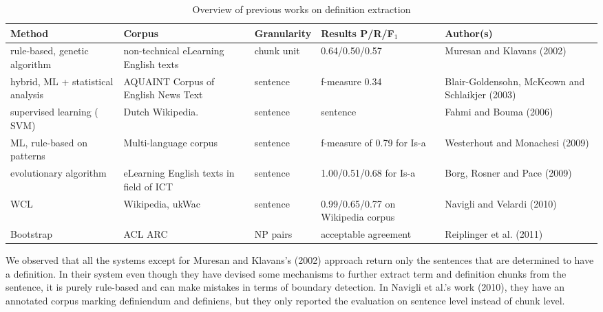 \documentclass[hyp]{socreport}
\begin{document}
\begin{table}
	
	\centering
    \begin{tabular}{|p{2.75cm}|p{2.75cm}|p{2.25cm}|p{2.75cm}|p{3cm}|}
\hline
        \bf{Method}                            & \bf{Corpus}                                  & \bf{Granularity} & \bf{Results P/R/F$_1$}                      & \bf{Author(s)}                                       \\ \hline
        rule-based, genetic algorithm     & non-technical eLearning English texts   & chunk unit  & 0.64/0.50/0.57                     & Muresan and Klavans (2002)                      \\ \hline
        hybrid, ML + statistical analysis & AQUAINT Corpus of English News Text     & sentence    & f-measure 0.34                     & Blair-Goldensohn, McKeown and Schlaikjer (2003) \\ \hline
        supervised learning ( SVM)        & Dutch Wikipedia.                        & sentence    & sentence                           & Fahmi and Bouma (2006)                          \\ \hline
        ML, rule-based on patterns        & Multi-language corpus                   & sentence    & f-measure of 0.79 for Is-a         & Westerhout and Monachesi (2009)                 \\ \hline
        evolutionary algorithm            & eLearning English texts in field of ICT & sentence    & 1.00/0.51/0.68 for Is-a            & Borg, Rosner and Pace (2009)                    \\ \hline
        WCL                               & Wikipedia, ukWac                        & sentence    & 0.99/0.65/0.77 on Wikipedia corpus & Navigli and Velardi (2010)                      \\ \hline
        Bootstrap                         & ACL ARC                                 & NP pairs    & acceptable agreement               & Reiplinger et al. (2011)                        \\
        \hline
    \end{tabular}
    
    \caption{Overview of previous works on definition extraction}
    \label{relatedworks}
\end{table}

We observed that all the systems except for Muresan and Klavans's (2002) approach
return only the sentences that are determined to have a definition. In their system even
though they have devised some mechanisms to further extract term and definition chunks
from the sentence, it is purely rule-based and can make mistakes in terms of boundary
detection. In Navigli et al.'s work (2010), they have an annotated corpus marking
definiendum and definiens, but they only reported the evaluation on sentence level
instead of chunk level.
\end{document}
